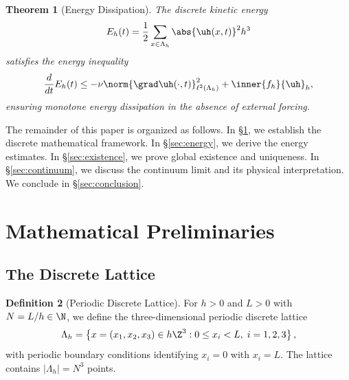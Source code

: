 \documentclass[12pt, a4paper]{article}
\theoremstyle{plain}
\newtheorem{theorem}{Theorem}[section]
\theoremstyle{definition}
\newtheorem{definition}[theorem]{Definition}
\begin{document}
\begin{theorem}[Energy Dissipation]\label{thm:energy}
  The discrete kinetic energy
  \begin{equation}
    E_h(t) = \frac{1}{2} \sum_{x \in \Lambda_h} \abs{\uh(x,t)}^2 h^3
  \end{equation}
  satisfies the energy inequality
  \begin{equation}\label{eq:energy_ineq}
    \frac{d}{dt} E_h(t) \leq -\nu \norm{\grad \uh(\cdot, t)}_{\ell^2(\Lambda_h)}^2 + \inner{f_h}{\uh}_h,
  \end{equation}
  ensuring monotone energy dissipation in the absence of external forcing.
\end{theorem}

The remainder of this paper is organized as follows. In \S\ref{sec:prelim},
we establish the discrete mathematical framework. In \S\ref{sec:energy}, we
derive the energy estimates. In \S\ref{sec:existence}, we prove global existence
and uniqueness. In \S\ref{sec:continuum}, we discuss the continuum limit and its
physical interpretation. We conclude in \S\ref{sec:conclusion}.

\section{Mathematical Preliminaries}\label{sec:prelim}

\subsection{The Discrete Lattice}

\begin{definition}[Periodic Discrete Lattice]\label{def:lattice}
  For $h > 0$ and $L > 0$ with $N = L/h \in \N$, we define the three-dimensional
  periodic discrete lattice
  \begin{equation}
    \Lambda_h = \left\{ x = (x_1, x_2, x_3) \in h\Z^3 : 0 \leq x_i < L, \; i = 1,2,3 \right\},
  \end{equation}
  with periodic boundary conditions identifying $x_i = 0$ with $x_i = L$.
  The lattice contains $|\Lambda_h| = N^3$ points.
\end{definition}
\end{document}
